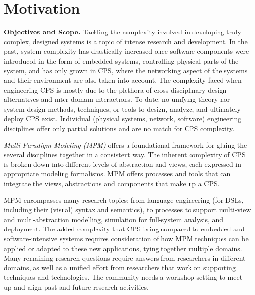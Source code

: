 \section{Motivation}
\label{sec:Motivation}


\noindent
\textbf{Objectives and Scope.}
%
Tackling the complexity involved in developing truly complex, designed systems 
is a topic of intense research and development.
In the past, system complexity has drastically increased once software components 
were introduced in the form of embedded systems, controlling physical parts of 
the system, and has only grown in CPS, where the networking aspect of the systems 
and their environment are also taken into account.
The complexity faced when engineering CPS is mostly due to the plethora of 
cross-disciplinary design alternatives and inter-domain interactions.
To date, no unifying theory nor system design methods, techniques, or tools to 
design, analyze, and ultimately deploy CPS exist.
Individual (physical systems, network, software) engineering disciplines offer 
only partial solutions and are no match for CPS complexity.



\emph{Multi-Paradigm Modeling (MPM)} offers a foundational framework for gluing the 
several disciplines together in a consistent way.
The inherent complexity of CPS is broken down into different levels of 
abstraction and views, each expressed in appropriate modeling formalisms.
MPM offers processes and tools that can integrate the views, abstractions and 
components that make up a CPS.

MPM encompasses many research topics: from language engineering (for DSLs, 
including their (visual) syntax and semantics), to processes to support multi-view 
and multi-abstraction modelling, simulation for full-system analysis, and deployment.
The added complexity that CPS bring compared to embedded and software-intensive 
systems requires consideration of how MPM techniques can be applied or adapted 
to these new applications, tying together multiple domains.
Many remaining research questions require answers from researchers in different 
domains, as well as a unified effort from researchers that work on supporting 
techniques and technologies.
The community needs a workshop setting to meet up and align past and future 
research activities.



